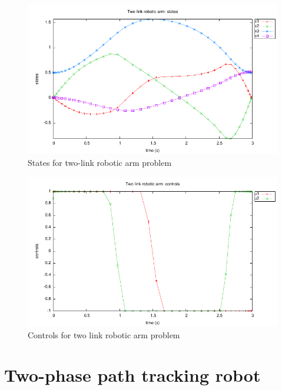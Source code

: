 \documentclass[a4paper,11pt]{report}    %
\newenvironment{shadedframe}{%
  \def\FrameCommand{\fcolorbox{black}{shadecolor}}%
  \MakeFramed {\FrameRestore}}
{\endMakeFramed}
\begin{document}
\begin{shadedframe}

\end{shadedframe}

\begin{figure}
  \centering 
  \includegraphics{../examples/twolink/twolinkarm_states}
  \caption{States for two-link robotic arm problem}
 \label{fig:twolinkarm_states}
\end{figure}


\begin{figure}
  \centering
  \includegraphics{../examples/twolink/twolinkarm_controls}
  \caption{Controls for two link robotic arm problem}
 \label{fig:twolinkarm_control}
\end{figure}




\section{Two-phase path tracking robot}
\end{document}
